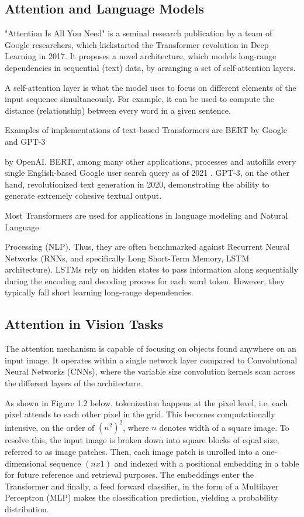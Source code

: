 \subsection{Attention and Language Models}

"Attention Is All You Need" is a seminal research publication
by a team of Google researchers, which kickstarted the Transformer revolution in Deep Learning in 2017.
It proposes a novel architecture, which models long-range dependencies in
sequential (text) data, by arranging a set of self-attention layers. 

A self-attention layer is what the model uses to focus on different elements of the 
input sequence simultaneously. For example, it can be used to compute the 
distance (relationship) between every word in a given sentence. \citep{Attention}


Examples of implementations of text-based Transformers are BERT by Google and GPT-3 

by OpenAI.
BERT, among many other applications, processes and autofills every single English-based 
Google user search query as of 2021 . \citep{bert}
GPT-3, on the other hand, revolutionized text generation in 2020, demonstrating the ability 
to generate extremely cohesive textual output.

Most Transformers are used for applications in language modeling and Natural Language 

Processing (NLP).
Thus, they are often benchmarked against Recurrent Neural Networks (RNNs, and specifically 
Long Short-Term Memory, LSTM architecture). LSTMs rely on hidden states to pass information 
along sequentially during the encoding and decoding process for each word token. 
However, they typically fall short learning long-range dependencies.


\subsection{Attention in Vision Tasks}

The attention mechanism is capable of focusing on objects found anywhere on an input image.
It operates within a single network layer compared to Convolutional Neural Networks (CNNs),
where the variable size convolution kernels scan across the different layers of the architecture.
\citep{dosovitskiy2020vit}

As shown in Figure 1.2 below, tokenization happens at the pixel level, i.e. each pixel attends to each other pixel in the grid. 
This becomes computationally intensive, on the order of $(n^2)^2$, where $n$ denotes width of a square image. 
To resolve this, the input image is broken down into square blocks of equal size, referred to as image patches.
Then, each image patch is unrolled into a one-dimensional sequence $(n x 1)$ and indexed with a positional 
embedding in a table for future reference and retrieval purposes. The embeddings enter the Transformer and 
finally, a feed forward classifier, in the form of a Multilayer Perceptron (MLP) 
makes the classification prediction, yielding a probability distribution. \citep{dosovitskiy2020vit}

